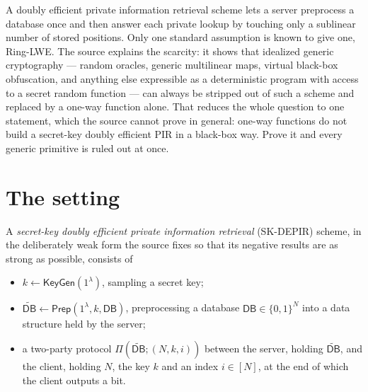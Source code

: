 \documentclass{conjura-conjecture}
\newcommand{\bits}{\{0,1\}}
\newcommand{\DB}{\mathsf{DB}}
\newcommand{\pDB}{\widetilde{\mathsf{DB}}}
\newcommand{\KeyGen}{\mathsf{KeyGen}}
\newcommand{\Prep}{\mathsf{Prep}}
\begin{document}

\vspace{0.4em}

\begin{informalconjecture}
A doubly efficient private information retrieval scheme lets a server
preprocess a database once and then answer each private lookup by
touching only a sublinear number of stored positions. Only one standard
assumption is known to give one, Ring-LWE\@. The source explains the
scarcity: it shows that idealized generic cryptography --- random
oracles, generic multilinear maps, virtual black-box obfuscation, and
anything else expressible as a deterministic program with access to a
secret random function --- can always be stripped out of such a scheme
and replaced by a one-way function alone. That reduces the whole question
to one statement, which the source cannot prove in general: one-way
functions do not build a secret-key doubly efficient PIR in a black-box
way. Prove it and every generic primitive is ruled out at once.
\end{informalconjecture}

\section{The setting}\label{sec:setting}

A \emph{secret-key doubly efficient private information retrieval}
(SK-DEPIR) scheme, in the deliberately weak form the source fixes so that
its negative results are as strong as possible, consists of

\begin{itemize}[nosep]
  \item $k \leftarrow \KeyGen(1^{\lambda})$, sampling a secret key;
  \item $\pDB \leftarrow \Prep(1^{\lambda}, k, \DB)$, preprocessing a
    database $\DB \in \bits^{N}$ into a data structure held by the
    server;
  \item a two-party protocol $\Pi(\pDB; (N,k,i))$ between the server,
    holding $\pDB$, and the client, holding $N$, the key $k$ and an index
    $i \in [N]$, at the end of which the client outputs a bit.
\end{itemize}
\end{document}
